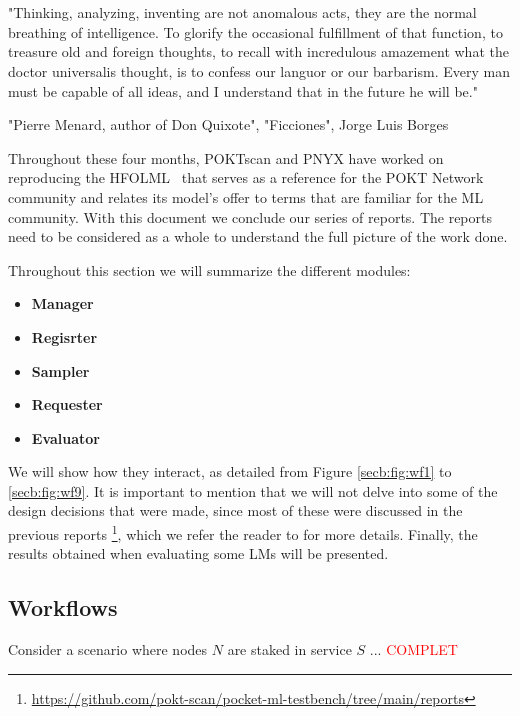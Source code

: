 \section{}\label{sec:b}
\setlength{\epigraphwidth}{\textwidth}
\epigraph{\small "Thinking, analyzing, inventing are not anomalous acts, they are the normal breathing of intelligence. 
To glorify the occasional fulfillment of that function, to treasure old and foreign thoughts, to recall with incredulous amazement what the doctor universalis thought, is to confess our languor or our barbarism. 
Every man must be capable of all ideas, and I understand that in the future he will be."}{"Pierre Menard, author of Don Quixote", "Ficciones", Jorge Luis Borges}

Throughout these four months, POKTscan and PNYX have worked on reproducing the \gls{HFOLML}~\cite{noauthor_open_nodate} that serves as a reference for the POKT Network community and relates its model's offer to terms that are familiar for the \gls{ML} community. 
With this document we conclude our series of reports. The reports need to be considered as a whole to understand the full picture of the work done.

Throughout this section we will summarize the different modules:

\begin{itemize}[noitemsep]
    \item \textbf{Manager}
    \item \textbf{Regisrter}
    \item \textbf{Sampler}
    \item \textbf{Requester}
    \item \textbf{Evaluator}
\end{itemize}

We will show how they interact, as detailed from Figure \ref{secb:fig:wf1} to \ref{secb:fig:wf9}. 
It is important to mention that we will not delve into some of the design decisions that were made, since most of these were discussed in the previous reports \footnote{\url{https://github.com/pokt-scan/pocket-ml-testbench/tree/main/reports}}, which we refer the reader to for more details. 
Finally, the results obtained when evaluating some \glspl{LM} will be presented.  

\subsection{Workflows}

Consider a scenario where nodes $N$ are staked in service $S$ ... \textcolor{red}{COMPLET}

